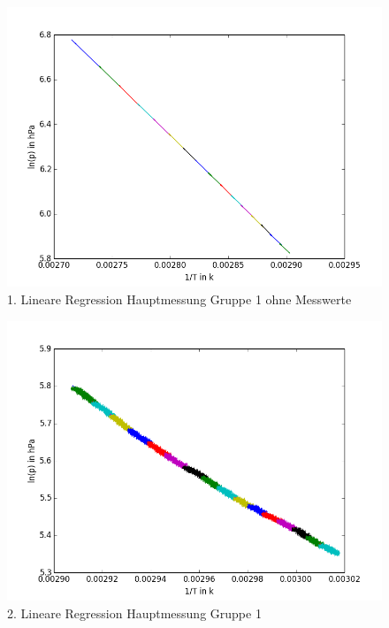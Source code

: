 \documentclass[12pt,a4paper]{article}
\begin{document}
\begin{figure}[H]
\centering
\includegraphics[scale=0.7]{Bilder/linreg_nurlinreg_JM_1.png}
\caption{1. Lineare Regression Hauptmessung Gruppe 1 ohne Messwerte}
\end{figure}
\begin{figure}[H]
\centering
\includegraphics[scale=0.7]{Bilder/linreg_lambda_JM_2.png}
\caption{2. Lineare Regression Hauptmessung Gruppe 1}
\end{figure}
\end{document}
